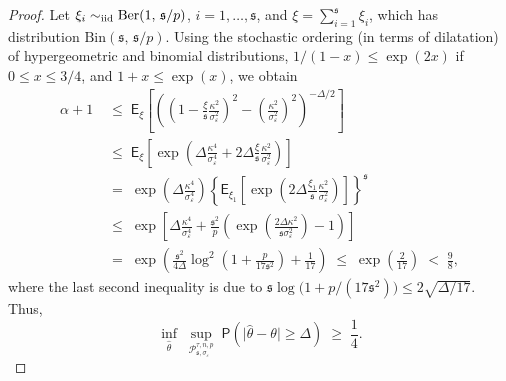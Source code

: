 \documentclass[11pt, a4paper]{article}
\newcommand{\mc}{\mathcal}
\newcommand{\vep}{\varepsilon}
\renewcommand{\l}{\left}
\renewcommand{\r}{\right}
\def\wh{\widehat}
\newcommand{\E}[0]{\mathsf{E}}
\newcommand{\p}{\mathsf{P}}
\newcommand{\iid}{\text{\upshape iid}}
\theoremstyle{definition}
\theoremstyle{definition}
\theoremstyle{definition}
\theoremstyle{definition}
\theoremstyle{definition}
\theoremstyle{remark}
\theoremstyle{definition}
\theoremstyle{definition}
\theoremstyle{definition}
\begin{document}
\begin{proof}
Let $\xi_i \sim_{\iid} \mathrm{Ber}(1,\,\mathfrak{s}/p)$, $i = 1,\ldots, \mathfrak{s}$, and $\xi = \sum_{i = 1}^{\mathfrak{s}}\xi_i$, which has distribution $\mathrm{Bin}(\mathfrak{s},\,\mathfrak{s}/p)$. Using the stochastic ordering (in terms of dilatation) of hypergeometric and binomial distributions, $1/(1 -x)\le \exp(2x)$ if $0 \le x \le 3/4$, and $1+x\le \exp(x)$, we obtain
\begin{align*}
 \alpha + 1 \;& \le\; \E_{\xi}\l[\l(\l(1-\frac{\xi}{\mathfrak{s}}\frac{\kappa^2}{\sigma_{\vep}^2}\r)^2 - \l(\frac{\kappa^2}{\sigma_{\vep}^2}\r)^2\r)^{-\Delta/2}\r]   \\
 & \le \; \E_{\xi}\l[\exp\l(\Delta \frac{\kappa^4}{\sigma_{\vep}^4} + 2\Delta\frac{\xi}{\mathfrak{s}}\frac{\kappa^2}{\sigma_{\vep}^2}\r)\r]\\
 & = \; \exp\l(\Delta \frac{\kappa^4}{\sigma_{\vep}^4}\r)\l\{\E_{\xi_1}\l[\exp\l(2\Delta\frac{\xi_1}{\mathfrak{s}}\frac{\kappa^2}{\sigma_{\vep}^2}\r)\r] \r\}^{\mathfrak{s}}\\
 & \le \; \exp\l[\Delta \frac{\kappa^4}{\sigma_{\vep}^4} + \frac{\mathfrak{s}^2}{p}\l(\exp\l(\frac{2\Delta\kappa^2}{\mathfrak{s}\sigma^2_{\vep}}\r) - 1\r)\r] \\
 & = \; \exp\l(\frac{\mathfrak{s}^2}{4\Delta}\log^2\l(1 + \frac{p}{17\mathfrak{s}^2}\r) + \frac{1}{17}\r)\; \le \; \exp\l(\frac{2}{17}\r) \; < \; \frac{9}{8},
\end{align*}
where the last second inequality is due to $\mathfrak{s}\log\bigl(1 + {p}/({17\mathfrak{s}^2})\bigr) \le 2\sqrt{{\Delta}/{17}}$. Thus, 
\[
\inf_{\wh\theta}\; \sup_{\mc P_{\mathfrak{s}, \sigma_{\vep}}^{\tau, n, p}} \;\p\l(\bigl\vert\wh\theta -\theta\bigr\vert \ge \Delta\r)\; \ge \; \frac{1}{4}.
\]

\bigskip


\end{proof}
\end{document}
